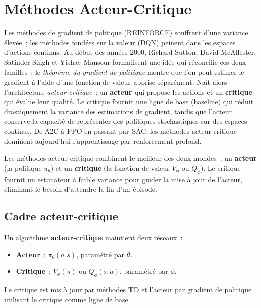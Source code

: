 \chapter{M\'ethodes Acteur-Critique}
\label{ch:acteur_critique}

Les m\'ethodes de gradient de politique (REINFORCE) souffrent d'une variance \'elev\'ee~; les m\'ethodes fond\'ees sur la valeur (DQN) peinent dans les espaces d'actions continus. Au d\'ebut des ann\'ees 2000, Richard Sutton, David McAllester, Satinder Singh et Yishay Mansour formalisent une id\'ee qui r\'econcilie ces deux familles~: le \emph{th\'eor\`eme du gradient de politique} montre que l'on peut estimer le gradient \`a l'aide d'une fonction de valeur apprise s\'epar\'ement. Na\^it alors l'architecture \emph{acteur-critique}~: un \textbf{acteur} qui propose les actions et un \textbf{critique} qui \'evalue leur qualit\'e. Le critique fournit une ligne de base (baseline) qui r\'eduit drastiquement la variance des estimations de gradient, tandis que l'acteur conserve la capacit\'e de repr\'esenter des politiques stochastiques sur des espaces continus. De A2C \`a PPO en passant par SAC, les m\'ethodes acteur-critique dominent aujourd'hui l'apprentissage par renforcement profond.

\begin{intuition}
Les m\'ethodes acteur-critique combinent le meilleur des deux mondes~: un
\textbf{acteur} (la politique $\pi_\theta$) et un \textbf{critique} (la
fonction de valeur $V_\phi$ ou $Q_\phi$). Le critique fournit un estimateur
\`a faible variance pour guider la mise \`a jour de l'acteur, \'eliminant
le besoin d'attendre la fin d'un \'episode.
\end{intuition}

\section{Cadre acteur-critique}

\begin{definition}
Un algorithme \textbf{acteur-critique} maintient deux r\'eseaux~:
\begin{itemize}
    \item \textbf{Acteur}~: $\pi_\theta(a|s)$, param\'etr\'e par $\theta$.
    \item \textbf{Critique}~: $V_\phi(s)$ ou $Q_\phi(s,a)$, param\'etr\'e par $\phi$.
\end{itemize}
Le critique est mis \`a jour par m\'ethodes TD et l'acteur par gradient de politique
utilisant le critique comme ligne de base.
\end{definition}

